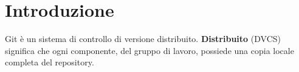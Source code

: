 %


\global\let\tikz@ensure@dollar@catcode=\relax %


\section{Introduzione} %
\label{sec:introduzione}
Git è un sistema di controllo di versione distribuito.
\newline
\textbf{Distribuito} (DVCS) significa che ogni componente, del gruppo di lavoro, possiede una copia locale completa del repository.
\newline

